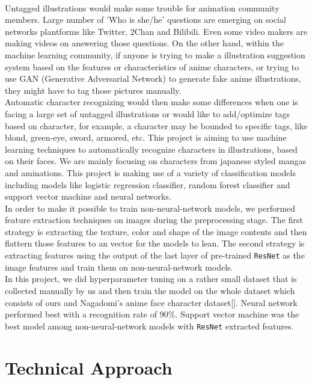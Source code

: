 \documentclass[11.5pt]{article}
\begin{document}
    \\ 
    Untagged illustrations would make some trouble for animation community members.
    Large number of 'Who is she/he' questions are emerging on social networks plantforms like Twitter, 2Chan and Bilibili.
    Even some video makers are making videos on answering those questions.
    On the other hand, within the machine learning community, if anyone is trying to make a illustration suggestion system based on the features or characteristics of anime characters, or trying to use GAN (Generative Adversarial Network) to generate fake anime illustrations, they might have to tag those pictures manually.\\ 
    Automatic character recognizing would then make some differences when one is facing a large set of untagged illustrations or would like to add/optimize tags based on character, for example, a character may be bounded to specific tags, like blond, green-eye, sword, armored, etc.
    This project is aiming to use machine learning techniques to automatically recognize characters in illustrations, based on their faces. We are mainly focusing on characters from japanese styled mangas and aminations. This project is making use of a variety of classification models including models like logistic regression classifier, random forest classifier and support vector machine and neural networks.\\ 
    In order to make it possible to train non-neural-network models, we performed feature extraction techniques on images during the preprocessing stage. The first strategy is extracting the texture, color and shape of the image contents and then flattern those features to an vector for the models to lean. The second strategy is extracting features using the output of the last layer of pre-trained \texttt{ResNet}\cite{resnet} as the image features and train them on non-neural-network models.\\ 
    In this project, we did hyperparameter tuning on a rather small dataset that is collected manually by us and then train the model on the whole dataset which consists of ours and Nagadomi's anime face character dataset[]. Neural network performed best with a recognition rate of 90\%. Support vector machine was the best model among non-neural-network models with \texttt{ResNet}\cite{resnet} extracted features. 


    \section{Technical Approach}
\end{document}

